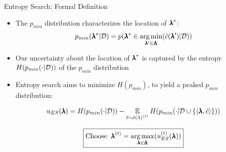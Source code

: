 \begin{frame}[c]{Entropy Search: Formal Definition}
\begin{itemize}

    \item The $p_{min}$ distribution characterizes the location of $\optconf$: \alert{\[p_{min}(\conf^*|\dataset) = p(\conf^* \in \argmin_{\conf' \in \pcs} (\surro(\conf') | \dataset))\]}
\smallskip
\pause
    \item Our uncertainty about the location of $\optconf$ is captured by the \alert{entropy $H( p_{min}(\cdot |\dataset))$ of the $p_{min}$ distribution}
\bigskip    
\pause
\item \alert{Entropy search aims to minimize $H(p_{min})$}, to yield a peaked $p_{min}$ distribution:
    
    \alert{\[u_{ES}(\conf) = H( p_{min}(\cdot |\dataset)) - \E_{\tilde{\cost} \sim \iter[\bocount]{\surro(\lambda)}} H( p_{min}(\cdot |\dataset \cup \left\{\left\langle\conf, \tilde{\cost} \right\rangle \right\})) \]}
    
    \[
    \boxed{\text{Choose}\;\;\bonextsample = \argmax_{\conf\in\pcs}(\iter{\acq}_{ES}(\conf))}
    \]
\end{itemize}

\end{frame}


